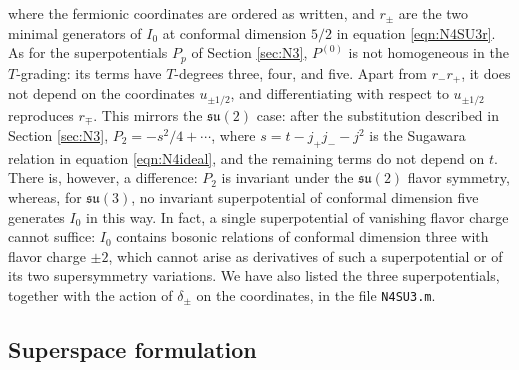 \documentclass[12pt]{article}
\numberwithin{equation}{section}
\numberwithin{figure}{section}
\theoremstyle{plain}
\theoremstyle{definition}
\begin{document}
where the fermionic coordinates are ordered as written, and $r_\pm$ are the two minimal generators of $I_0$ at conformal dimension $5/2$ in equation \eqref{eqn:N4SU3r}. As for the superpotentials $P_p$ of Section \ref{sec:N3}, $P^{(0)}$ is not homogeneous in the $T$-grading: its terms have $T$-degrees three, four, and five. Apart from $r_- r_+$, it does not depend on the coordinates $u_{\pm 1/2}$, and differentiating with respect to $u_{\pm 1/2}$ reproduces $r_\mp$. This mirrors the $\mathfrak{su}(2)$ case: after the substitution described in Section \ref{sec:N3}, $P_2 = -s^2/4 + \cdots$, where $s = t - j_+ j_- - j^2$ is the Sugawara relation in equation \eqref{eqn:N4ideal}, and the remaining terms do not depend on $t$. There is, however, a difference: $P_2$ is invariant under the $\mathfrak{su}(2)$ flavor symmetry, whereas, for $\mathfrak{su}(3)$, no invariant superpotential of conformal dimension five generates $I_0$ in this way. In fact, a single superpotential of vanishing flavor charge cannot suffice: $I_0$ contains bosonic relations of conformal dimension three with flavor charge $\pm 2$, which cannot arise as derivatives of such a superpotential or of its two supersymmetry variations. We have also listed the three superpotentials, together with the action of $\delta_\pm$ on the coordinates, in the file {\tt N4SU3.m}.

\subsection{Superspace formulation}\label{sec:N4superspace}
\end{document}
